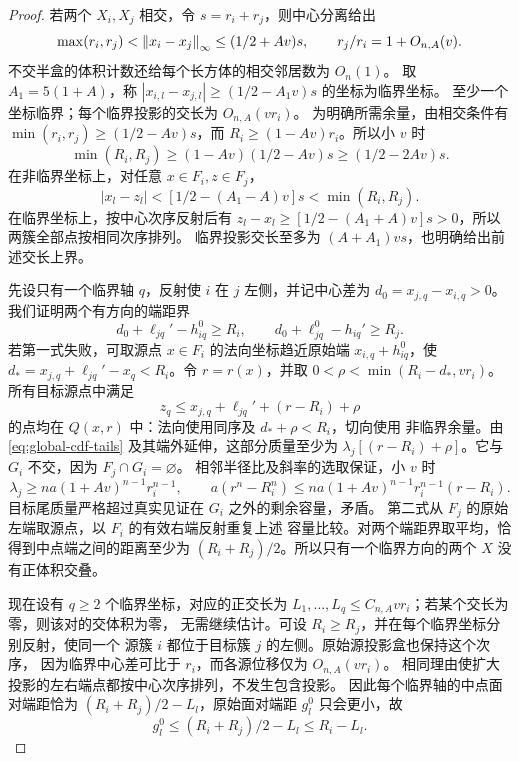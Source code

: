 \begin{proof}
若两个 \(X_i,X_j\) 相交，令 \(s=r_i+r_j\)，则中心分离给出
\[
 \max(r_i,r_j)<\left\lVert x_i-x_j\right\rVert_\infty\le(1/2+Av)s,
 \qquad r_j/r_i=1+O_{n,A}(v).
\]
不交半盒的体积计数还给每个长方体的相交邻居数为 \(O_n(1)\)。
取 \(A_1=5(1+A)\)，称
\( |x_{i,l}-x_{j,l}|\ge(1/2-A_1v)s\) 的坐标为临界坐标。
至少一个坐标临界；每个临界投影的交长为 \(O_{n,A}(vr_i)\)。
为明确所需余量，由相交条件有
\(\min(r_i,r_j)\ge(1/2-Av)s\)，而
\(R_i\ge(1-Av)r_i\)。所以小 \(v\) 时
\[
 \min(R_i,R_j)\ge(1-Av)(1/2-Av)s\ge(1/2-2Av)s.
\]
在非临界坐标上，对任意 \(x\in F_i,z\in F_j\)，
\[
 |x_l-z_l|<[1/2-(A_1-A)v]s<\min(R_i,R_j).
\]
在临界坐标上，按中心次序反射后有
\(z_l-x_l\ge[1/2-(A_1+A)v]s>0\)，所以两簇全部点按相同次序排列。
临界投影交长至多为 \((A+A_1)vs\)，也明确给出前述交长上界。

先设只有一个临界轴 \(q\)，反射使 \(i\) 在 \(j\) 左侧，并记中心差为
\(d_0=x_{j,q}-x_{i,q}>0\)。我们证明两个有方向的端距界
\begin{equation}\label{eq:global-cdf-face-separation}
 d_0+\ell_{jq}'-h_{iq}^0\ge R_i,\qquad
 d_0+\ell_{jq}^0-h_{iq}'\ge R_j.
\end{equation}
若第一式失败，可取源点 \(x\in F_i\) 的法向坐标趋近原始端
\(x_{i,q}+h_{iq}^0\)，使
\(d_*=x_{j,q}+\ell_{jq}'-x_q<R_i\)。令 \(r=r(x)\)，并取
\(0<\rho<\min(R_i-d_*,vr_i)\)。所有目标源点中满足
\[
 z_q\le x_{j,q}+\ell_{jq}'+(r-R_i)+\rho
\]
的点均在 \(Q(x,r)\) 中：法向使用同序及 \(d_*+\rho<R_i\)，切向使用
非临界余量。由 \eqref{eq:global-cdf-tails} 及其端外延伸，这部分质量至少为
\(\lambda_j[(r-R_i)+\rho]\)。它与 \(G_i\) 不交，因为 \(F_j\cap G_i=\varnothing\)。
相邻半径比及斜率的选取保证，小 \(v\) 时
\[
 \lambda_j\ge n a(1+Av)^{n-1}r_i^{n-1},\qquad
 a(r^n-R_i^n)\le n a(1+Av)^{n-1}r_i^{n-1}(r-R_i).
\]
目标尾质量严格超过真实见证在 \(G_i\) 之外的剩余容量，矛盾。
第二式从 \(F_j\) 的原始左端取源点，以 \(F_i\) 的有效右端反射重复上述
容量比较。对两个端距界取平均，恰得到中点端之间的距离至少为
\((R_i+R_j)/2\)。所以只有一个临界方向的两个 \(X\) 没有正体积交叠。

现在设有 \(q\ge2\) 个临界坐标，对应的正交长为
\(L_1,\ldots,L_q\le C_{n,A}vr_i\)；若某个交长为零，则该对的交体积为零，
无需继续估计。可设 \(R_i\ge R_j\)，并在每个临界坐标分别反射，使同一个
源簇 \(i\) 都位于目标簇 \(j\) 的左侧。原始源投影盒也保持这个次序，
因为临界中心差可比于 \(r_i\)，而各源位移仅为 \(O_{n,A}(vr_i)\)。
相同理由使扩大投影的左右端点都按中心次序排列，不发生包含投影。
因此每个临界轴的中点面对端距恰为
\((R_i+R_j)/2-L_l\)，原始面对端距 \(g_l^0\) 只会更小，故
\begin{equation}\label{eq:global-corner-facing-gap}
 g_l^0\le(R_i+R_j)/2-L_l\le R_i-L_l.
\end{equation}


\end{proof}
